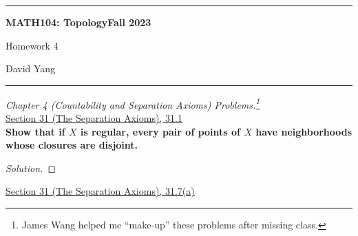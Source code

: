 \documentclass[11pt]{article}
\newenvironment{solution}
  {\renewcommand\qedsymbol{$\blacksquare$}\begin{proof}[Solution]}
  {\end{proof}}
\begin{document}
	\hrule
	\begin{center}
        \textbf{MATH104: Topology}\hfill \textbf{Fall 2023}\newline

		{\Large Homework 4}

		David Yang
	\end{center}

\hrule

\vspace{1em}

\textit{Chapter 4 (Countability and Separation Axioms) Problems.\footnote{James Wang helped me ``make-up'' these problems after missing class.}} \\

\underline{Section 31 (The Separation Axioms), 31.1} \\

\textbf{Show that if $X$ is regular, every pair of points of $X$ have neighborhoods whose closures are disjoint.}

\begin{solution}
    
\end{solution}

\underline{Section 31 (The Separation Axioms), 31.7(a)} \\
\end{document}
